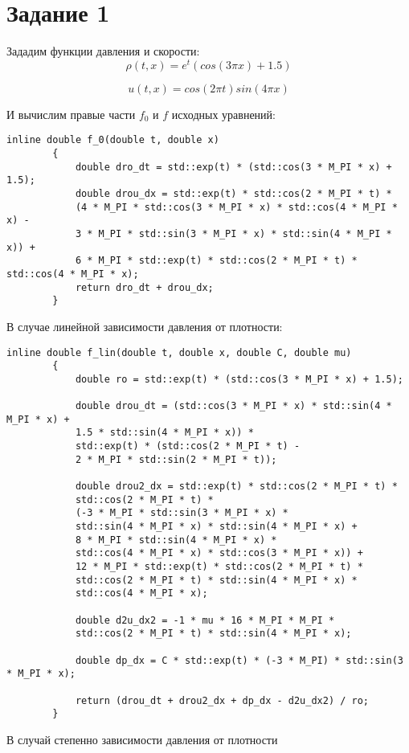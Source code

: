 \documentclass[11pt]{extarticle}
\begin{document}
	\section{Задание 1}
	Зададим функции давления и скорости:
	\begin{equation}
		\rho(t, x) = e^{t}(cos(3\pi x) + 1.5)
	\end{equation}

	\begin{equation}
		u(t, x) = cos(2\pi t)sin(4\pi x)
	\end{equation}

	И вычислим правые части $f_{0}$ и $f$ исходных уравнений:
	\begin{lstlisting}[]
		inline double f_0(double t, double x)
		{
			double dro_dt = std::exp(t) * (std::cos(3 * M_PI * x) + 1.5); 
			double drou_dx = std::exp(t) * std::cos(2 * M_PI * t) * 
			(4 * M_PI * std::cos(3 * M_PI * x) * std::cos(4 * M_PI * x) -
			3 * M_PI * std::sin(3 * M_PI * x) * std::sin(4 * M_PI * x)) + 
			6 * M_PI * std::exp(t) * std::cos(2 * M_PI * t) * std::cos(4 * M_PI * x);
			return dro_dt + drou_dx;
		}
	\end{lstlisting}
	В случае линейной зависимости давления от плотности:
	\begin{lstlisting}[]
		inline double f_lin(double t, double x, double C, double mu)
		{
			double ro = std::exp(t) * (std::cos(3 * M_PI * x) + 1.5);
			
			double drou_dt = (std::cos(3 * M_PI * x) * std::sin(4 * M_PI * x) + 
			1.5 * std::sin(4 * M_PI * x)) *
			std::exp(t) * (std::cos(2 * M_PI * t) - 
			2 * M_PI * std::sin(2 * M_PI * t));
			
			double drou2_dx = std::exp(t) * std::cos(2 * M_PI * t) * 
			std::cos(2 * M_PI * t) * 
			(-3 * M_PI * std::sin(3 * M_PI * x) * 
			std::sin(4 * M_PI * x) * std::sin(4 * M_PI * x) + 
			8 * M_PI * std::sin(4 * M_PI * x) * 
			std::cos(4 * M_PI * x) * std::cos(3 * M_PI * x)) +
			12 * M_PI * std::exp(t) * std::cos(2 * M_PI * t) * 
			std::cos(2 * M_PI * t) * std::sin(4 * M_PI * x) * 
			std::cos(4 * M_PI * x);
			
			double d2u_dx2 = -1 * mu * 16 * M_PI * M_PI * 
			std::cos(2 * M_PI * t) * std::sin(4 * M_PI * x);
			
			double dp_dx = C * std::exp(t) * (-3 * M_PI) * std::sin(3 * M_PI * x);
			
			return (drou_dt + drou2_dx + dp_dx - d2u_dx2) / ro;
		}
	\end{lstlisting}
	В случай степенно зависимости давления от плотности
\end{document}
